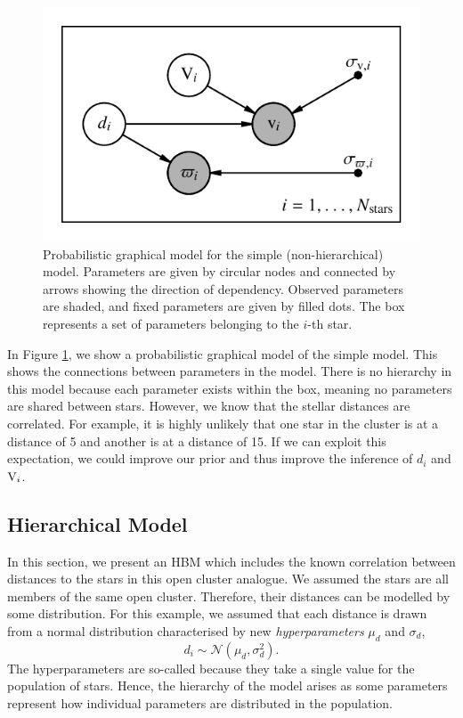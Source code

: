 \begin{figure}[tb]
    \centering
    \includegraphics{figures/simple-pgm.pdf}
    \caption[Probabilistic graphical model for the simple (non-hierarchical) model]{Probabilistic graphical model for the simple (non-hierarchical) model. Parameters are given by circular nodes and connected by arrows showing the direction of dependency. Observed parameters are shaded, and fixed parameters are given by filled dots. The box represents a set of parameters belonging to the \(i\)-th star.}
    \label{fig:simple-pgm}
\end{figure}

In Figure \ref{fig:simple-pgm}, we show a probabilistic graphical model of the simple model. This shows the connections between parameters in the model. There is no hierarchy in this model because each parameter exists within the box, meaning no parameters are shared between stars. However, we know that the stellar distances are correlated. For example, it is highly unlikely that one star in the cluster is at a distance of 5 and another is at a distance of 15. If we can exploit this expectation, we could improve our prior and thus improve the inference of \(d_i\) and \(\mathrm{V}_i\).

\subsection{Hierarchical Model}\label{sec:hbm-model}

In this section, we present an HBM which includes the known correlation between distances to the stars in this open cluster analogue. We assumed the stars are all members of the same open cluster. Therefore, their distances can be modelled by some distribution. For this example, we assumed that each distance is drawn from a normal distribution characterised by new \emph{hyperparameters} \(\mu_d\) and \(\sigma_d\),
%
\begin{equation}
    d_i \sim \mathcal{N}(\mu_d, \sigma_d^2).
\end{equation}
%
The hyperparameters are so-called because they take a single value for the population of stars. Hence, the hierarchy of the model arises as some parameters represent how individual parameters are distributed in the population.

